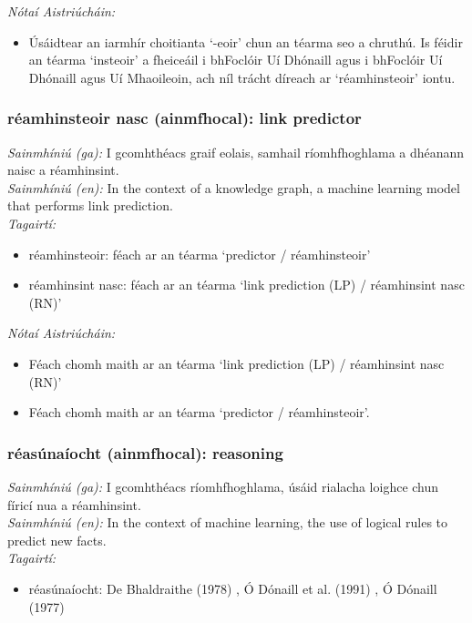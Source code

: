 \documentclass{article}
\begin{document}
 \noindent \textit{Nótaí Aistriúcháin:}
\begin{itemize}
	\item Úsáidtear an iarmhír choitianta `-eoir' chun an téarma seo a chruthú. Is féidir an téarma `insteoir' a fheiceáil i bhFoclóir Uí Dhónaill agus i bhFoclóir Uí Dhónaill agus Uí Mhaoileoin, ach níl trácht díreach ar `réamhinsteoir' iontu.
\end{itemize}


\subsubsection*{réamhinsteoir nasc (ainmfhocal): link predictor}
 \noindent \textit{Sainmhíniú (ga):} I gcomhthéacs graif eolais, samhail ríomhfhoghlama a dhéanann naisc a réamhinsint.
\\
 \noindent \textit{Sainmhíniú (en):} In the context of a knowledge graph, a machine learning model that performs link prediction.
\\
 \noindent \textit{Tagairtí:}
\begin{itemize}
	\item réamhinsteoir: féach ar an téarma `predictor / réamhinsteoir'
	\item réamhinsint nasc: féach ar an téarma `link prediction (LP) / réamhinsint nasc (RN)'
\end{itemize}

 \noindent \textit{Nótaí Aistriúcháin:}
\begin{itemize}
	\item Féach chomh maith ar an téarma `link prediction (LP) / réamhinsint nasc (RN)'
	\item Féach chomh maith ar an téarma `predictor / réamhinsteoir'.
\end{itemize}


\subsubsection*{réasúnaíocht (ainmfhocal): reasoning}
 \noindent \textit{Sainmhíniú (ga):} I gcomhthéacs ríomhfhoghlama, úsáid rialacha loighce chun fíricí nua a réamhinsint.
\\
 \noindent \textit{Sainmhíniú (en):} In the context of machine learning, the use of logical rules to predict new facts.
\\
 \noindent \textit{Tagairtí:}
\begin{itemize}
	\item réasúnaíocht: De Bhaldraithe (1978) \cite{de-bhaldraithe}, Ó Dónaill et al. (1991) \cite{focloir-beag}, Ó Dónaill (1977) \cite{odonaill}
\end{itemize}
\end{document}
